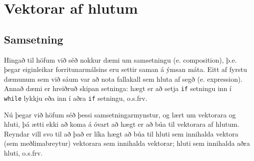 





\chapter{Vektorar af hlutum}

\section{Samsetning}

Hingað til höfum við séð nokkur dæmi um samsetningu (e. composition), þ.e. þegar eiginleikar forritunarmálsins eru settir saman á ýmsan máta.
Eitt af fyrstu dæmunum sem við sáum var að nota fallakall sem hluta af segð (e. expression).
Annað dæmi er hreiðruð skipan setninga: hægt er að setja {\tt if} setningu inn í {\tt while} lykkju eða inn í aðra {\tt if} setningu, o.s.frv.

Nú þegar við höfum séð þessi samsetningarmynstur, og lært um vektorara og hluti, þá ætti ekki að koma á óvart að hægt er að búa til vektorara af hlutum.
Reyndar vill svo til að það er líka hægt að búa til hluti sem innihalda vektora (sem meðlimabreytur) vektorara sem innihalda vektorar; hluti sem innihalda aðra hluti, o.s.frv.

